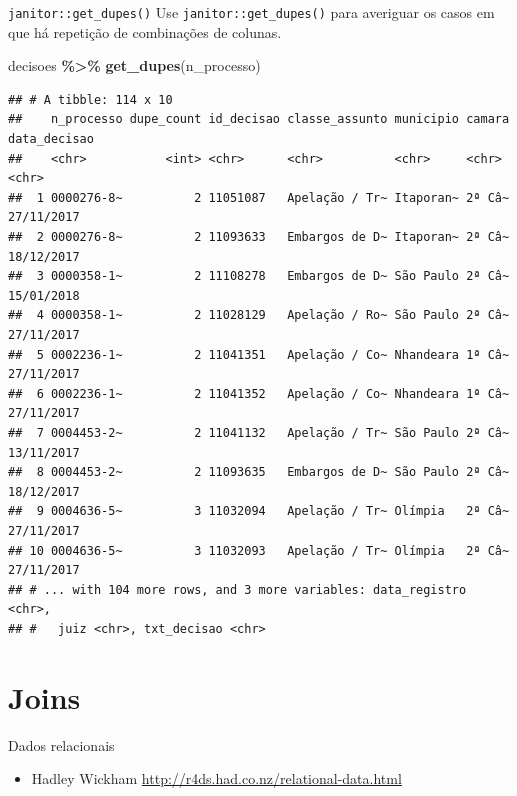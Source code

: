 \documentclass[
  10pt,
  ignorenonframetext,
]{beamer}
\newenvironment{Shaded}{\begin{snugshade}}{\end{snugshade}}
\newcommand{\KeywordTok}[1]{\textcolor[rgb]{0.13,0.29,0.53}{\textbf{#1}}}
\newcommand{\NormalTok}[1]{#1}
\newcommand{\OperatorTok}[1]{\textcolor[rgb]{0.81,0.36,0.00}{\textbf{#1}}}
\newcommand{\StringTok}[1]{\textcolor[rgb]{0.31,0.60,0.02}{#1}}
\providecommand{\tightlist}{%
  \setlength{\itemsep}{0pt}\setlength{\parskip}{0pt}}
\begin{document}
\begin{frame}[fragile]{\texttt{janitor::get\_dupes()}}
\protect\hypertarget{janitorget_dupes}{}
Use \texttt{janitor::get\_dupes()} para averiguar os casos em que há
repetição de combinações de colunas.

\begin{Shaded}
\begin{Highlighting}[]
\NormalTok{decisoes }\OperatorTok{\%\textgreater{}\%}\StringTok{ }
\StringTok{  }\KeywordTok{get\_dupes}\NormalTok{(n\_processo)}
\end{Highlighting}
\end{Shaded}

\begin{verbatim}
## # A tibble: 114 x 10
##    n_processo dupe_count id_decisao classe_assunto municipio camara data_decisao
##    <chr>           <int> <chr>      <chr>          <chr>     <chr>  <chr>       
##  1 0000276-8~          2 11051087   Apelação / Tr~ Itaporan~ 2ª Câ~ 27/11/2017  
##  2 0000276-8~          2 11093633   Embargos de D~ Itaporan~ 2ª Câ~ 18/12/2017  
##  3 0000358-1~          2 11108278   Embargos de D~ São Paulo 2ª Câ~ 15/01/2018  
##  4 0000358-1~          2 11028129   Apelação / Ro~ São Paulo 2ª Câ~ 27/11/2017  
##  5 0002236-1~          2 11041351   Apelação / Co~ Nhandeara 1ª Câ~ 27/11/2017  
##  6 0002236-1~          2 11041352   Apelação / Co~ Nhandeara 1ª Câ~ 27/11/2017  
##  7 0004453-2~          2 11041132   Apelação / Tr~ São Paulo 2ª Câ~ 13/11/2017  
##  8 0004453-2~          2 11093635   Embargos de D~ São Paulo 2ª Câ~ 18/12/2017  
##  9 0004636-5~          3 11032094   Apelação / Tr~ Olímpia   2ª Câ~ 27/11/2017  
## 10 0004636-5~          3 11032093   Apelação / Tr~ Olímpia   2ª Câ~ 27/11/2017  
## # ... with 104 more rows, and 3 more variables: data_registro <chr>,
## #   juiz <chr>, txt_decisao <chr>
\end{verbatim}
\end{frame}

\hypertarget{joins}{%
\section{Joins}\label{joins}}

\begin{frame}{Dados relacionais}
\protect\hypertarget{dados-relacionais}{}
\begin{itemize}
\tightlist
\item
  Hadley Wickham \url{http://r4ds.had.co.nz/relational-data.html}
\end{itemize}
\end{frame}
\end{document}
